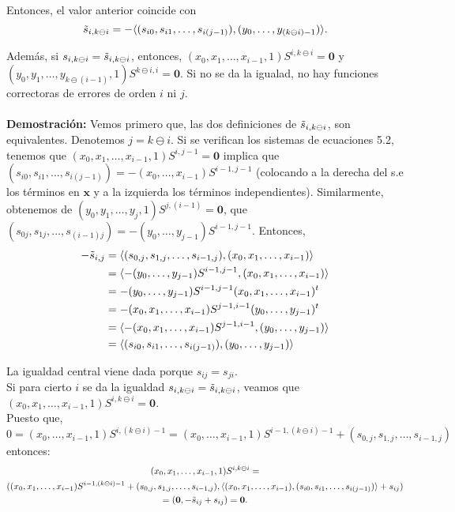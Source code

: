 \documentclass[11pt,spanish]{book}
\begin{document}
 Entonces, el valor anterior coincide con 
 $$\Tilde{s}_{i,k\ominus i}=-\langle  (s_{i0},s_{i1},\ldots,s_{i(j-1)}),(y_0,\ldots,y_{(k\ominus i)-1})\rangle.$$
 
 Además, si $s_{i,k\ominus i}=\Tilde{s}_{i,k\ominus i}$, entonces, $(x_0,x_1,\ldots,x_{i-1},1)S^{i,k\ominus i}=\mathbf{0}$ y\\ $(y_0,y_1,\ldots,y_{k\ominus (i-1)},1)S^{k\ominus i, i}=\mathbf{0}$. Si no se da la igualad, no hay funciones correctoras de errores de orden $i$ ni $j$. \\
 \\ \textbf{Demostración: } Vemos primero que, las dos definiciones de $\Tilde{s}_{i,k\ominus i}$, son equivalentes. Denotemos $j=k\ominus i$. Si se verifican los sistemas de ecuaciones 5.2, tenemos que $(x_0,x_1,\ldots,x_{i-1},1)S^{i,j-1}=\mathbf{0}$ implica que $(s_{i0},s_{i1},\ldots,s_{i(j-1)})=-(x_0,\ldots,x_{i-1})S^{i-1,j-1}$ (colocando a la derecha del s.e los términos en $\mathbf{x}$ y a la izquierda los términos independientes). Similarmente, obtenemos de $(y_0,y_1,\ldots,y_{j},1)S^{j, (i-1)}=\mathbf{0}$, que $(s_{0j},s_{1j},\ldots,s_{(i-1)j})=-(y_0,\ldots,y_{j-1})S^{i-1,j-1}$. Entonces,
 \begin{align*}
     -\Tilde{s}_{i,j}&=\langle (s_{0,j},s_{1,j},\ldots, s_{i-1,j} ),(x_0,x_1,\ldots, x_{i-1})\rangle\\ &=\langle -(y_0,\ldots,y_{j-1})S^{i-1,j-1},(x_0,x_1,\ldots, x_{i-1})\rangle\\&=-(y_0,\ldots,y_{j-1})S^{i-1,j-1}(x_0,x_1,\ldots, x_{i-1})^{t}\\&=-(x_0,x_1,\ldots, x_{i-1})S^{j-1,i-1}(y_0,\ldots,y_{j-1})^{t}\\ &= \langle -(x_0,x_1,\ldots, x_{i-1})S^{j-1,i-1}, (y_0,\ldots,y_{j-1})\rangle\\ &= \langle (s_{i0},s_{i1},\ldots,s_{i(j-1)}),(y_0,\ldots,y_{j-1})\rangle
 \end{align*}

 La igualdad central viene dada porque $s_{ij}=s_{ji}$.\\ 
 Si para cierto $i$ se da la igualdad $s_{i,k\ominus i}=\Tilde{s}_{i,k\ominus i} $, veamos que $(x_0,x_1,\ldots,x_{i-1},1)S^{i,k\ominus i}=\mathbf{0}$.\\
 
 Puesto que,
 $$0=(x_0,\ldots,x_{i-1},1)S^{i,(k\ominus i)-1}=(x_0,\ldots,x_{i-1},1)S^{i-1,(k\ominus i)-1}+ (s_{0,j},s_{1,j},\ldots, s_{i-1,j} )$$ entonces:
 \begin{multline*}
 (x_0,x_1,\ldots, x_{i-1},1)S^{i,k\ominus i}=\\((x_0,x_1,\ldots, x_{i-1})S^{i-1,(k\ominus i) -1}+(s_{0,j},s_{1,j},\ldots, s_{i-1,j} ), \langle (x_0,x_1,\ldots, x_{i-1}),  (s_{i0},s_{i1},\ldots,s_{i(j-1)})\rangle +s_{ij} )\\=(\mathbf{0}, -\Tilde{s}_{ij}+s_{ij})=\mathbf{0}.
  \end{multline*}
\end{document}
